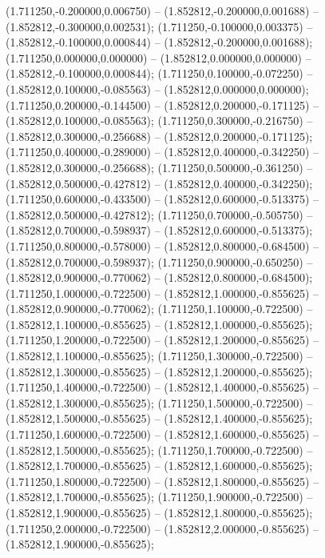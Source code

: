  (1.711250,-0.200000,0.006750) -- (1.852812,-0.200000,0.001688) -- (1.852812,-0.300000,0.002531);
 (1.711250,-0.100000,0.003375) -- (1.852812,-0.100000,0.000844) -- (1.852812,-0.200000,0.001688);
 (1.711250,0.000000,0.000000) -- (1.852812,0.000000,0.000000) -- (1.852812,-0.100000,0.000844);
 (1.711250,0.100000,-0.072250) -- (1.852812,0.100000,-0.085563) -- (1.852812,0.000000,0.000000);
 (1.711250,0.200000,-0.144500) -- (1.852812,0.200000,-0.171125) -- (1.852812,0.100000,-0.085563);
 (1.711250,0.300000,-0.216750) -- (1.852812,0.300000,-0.256688) -- (1.852812,0.200000,-0.171125);
 (1.711250,0.400000,-0.289000) -- (1.852812,0.400000,-0.342250) -- (1.852812,0.300000,-0.256688);
 (1.711250,0.500000,-0.361250) -- (1.852812,0.500000,-0.427812) -- (1.852812,0.400000,-0.342250);
 (1.711250,0.600000,-0.433500) -- (1.852812,0.600000,-0.513375) -- (1.852812,0.500000,-0.427812);
 (1.711250,0.700000,-0.505750) -- (1.852812,0.700000,-0.598937) -- (1.852812,0.600000,-0.513375);
 (1.711250,0.800000,-0.578000) -- (1.852812,0.800000,-0.684500) -- (1.852812,0.700000,-0.598937);
 (1.711250,0.900000,-0.650250) -- (1.852812,0.900000,-0.770062) -- (1.852812,0.800000,-0.684500);
 (1.711250,1.000000,-0.722500) -- (1.852812,1.000000,-0.855625) -- (1.852812,0.900000,-0.770062);
 (1.711250,1.100000,-0.722500) -- (1.852812,1.100000,-0.855625) -- (1.852812,1.000000,-0.855625);
 (1.711250,1.200000,-0.722500) -- (1.852812,1.200000,-0.855625) -- (1.852812,1.100000,-0.855625);
 (1.711250,1.300000,-0.722500) -- (1.852812,1.300000,-0.855625) -- (1.852812,1.200000,-0.855625);
 (1.711250,1.400000,-0.722500) -- (1.852812,1.400000,-0.855625) -- (1.852812,1.300000,-0.855625);
 (1.711250,1.500000,-0.722500) -- (1.852812,1.500000,-0.855625) -- (1.852812,1.400000,-0.855625);
 (1.711250,1.600000,-0.722500) -- (1.852812,1.600000,-0.855625) -- (1.852812,1.500000,-0.855625);
 (1.711250,1.700000,-0.722500) -- (1.852812,1.700000,-0.855625) -- (1.852812,1.600000,-0.855625);
 (1.711250,1.800000,-0.722500) -- (1.852812,1.800000,-0.855625) -- (1.852812,1.700000,-0.855625);
 (1.711250,1.900000,-0.722500) -- (1.852812,1.900000,-0.855625) -- (1.852812,1.800000,-0.855625);
 (1.711250,2.000000,-0.722500) -- (1.852812,2.000000,-0.855625) -- (1.852812,1.900000,-0.855625);

